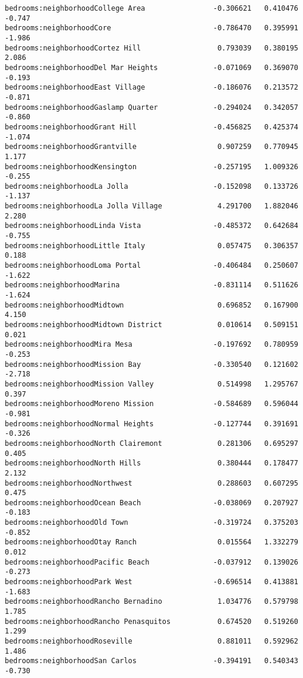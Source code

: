 \documentclass[
  letterpaper,
  krantz2]{style/krantz}
\begin{document}
\begin{verbatim}
bedrooms:neighborhoodCollege Area                -0.306621   0.410476  -0.747
bedrooms:neighborhoodCore                        -0.786470   0.395991  -1.986
bedrooms:neighborhoodCortez Hill                  0.793039   0.380195   2.086
bedrooms:neighborhoodDel Mar Heights             -0.071069   0.369070  -0.193
bedrooms:neighborhoodEast Village                -0.186076   0.213572  -0.871
bedrooms:neighborhoodGaslamp Quarter             -0.294024   0.342057  -0.860
bedrooms:neighborhoodGrant Hill                  -0.456825   0.425374  -1.074
bedrooms:neighborhoodGrantville                   0.907259   0.770945   1.177
bedrooms:neighborhoodKensington                  -0.257195   1.009326  -0.255
bedrooms:neighborhoodLa Jolla                    -0.152098   0.133726  -1.137
bedrooms:neighborhoodLa Jolla Village             4.291700   1.882046   2.280
bedrooms:neighborhoodLinda Vista                 -0.485372   0.642684  -0.755
bedrooms:neighborhoodLittle Italy                 0.057475   0.306357   0.188
bedrooms:neighborhoodLoma Portal                 -0.406484   0.250607  -1.622
bedrooms:neighborhoodMarina                      -0.831114   0.511626  -1.624
bedrooms:neighborhoodMidtown                      0.696852   0.167900   4.150
bedrooms:neighborhoodMidtown District             0.010614   0.509151   0.021
bedrooms:neighborhoodMira Mesa                   -0.197692   0.780959  -0.253
bedrooms:neighborhoodMission Bay                 -0.330540   0.121602  -2.718
bedrooms:neighborhoodMission Valley               0.514998   1.295767   0.397
bedrooms:neighborhoodMoreno Mission              -0.584689   0.596044  -0.981
bedrooms:neighborhoodNormal Heights              -0.127744   0.391691  -0.326
bedrooms:neighborhoodNorth Clairemont             0.281306   0.695297   0.405
bedrooms:neighborhoodNorth Hills                  0.380444   0.178477   2.132
bedrooms:neighborhoodNorthwest                    0.288603   0.607295   0.475
bedrooms:neighborhoodOcean Beach                 -0.038069   0.207927  -0.183
bedrooms:neighborhoodOld Town                    -0.319724   0.375203  -0.852
bedrooms:neighborhoodOtay Ranch                   0.015564   1.332279   0.012
bedrooms:neighborhoodPacific Beach               -0.037912   0.139026  -0.273
bedrooms:neighborhoodPark West                   -0.696514   0.413881  -1.683
bedrooms:neighborhoodRancho Bernadino             1.034776   0.579798   1.785
bedrooms:neighborhoodRancho Penasquitos           0.674520   0.519260   1.299
bedrooms:neighborhoodRoseville                    0.881011   0.592962   1.486
bedrooms:neighborhoodSan Carlos                  -0.394191   0.540343  -0.730

\end{verbatim}
\end{document}
